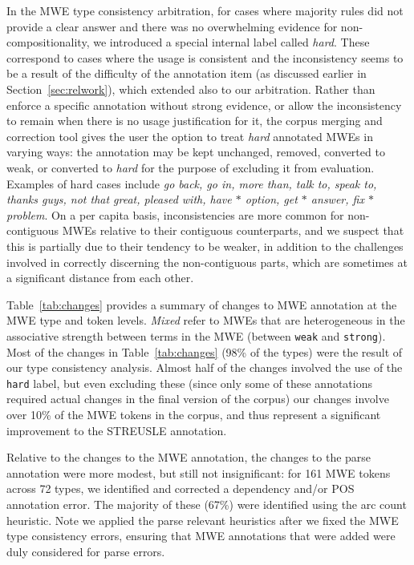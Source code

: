 \documentclass[output=paper
,modfonts
,nonflat]{langsci/langscibook}
\newcommand{\lex}[1]{\textit{#1}\xspace}
\newcommand{\mwetype}[1]{\texttt{#1}\xspace}
\newcommand{\strongish}{\mwetype{strong}}
\newcommand{\weak}{\mwetype{weak}}
\newcommand{\hard}{\mwetype{hard}}
\newcommand{\gap}{$*$\xspace}
\newcommand{\tableref}[1]{Table~\ref{#1}\xspace}
\newcommand{\sectionref}[1]{Section~\ref{#1}\xspace}
\begin{document}
In the MWE type consistency arbitration, for cases where majority rules did not provide a clear answer and there was no overwhelming evidence for non-compositionality, we introduced a special internal label called \lex{hard}. These correspond to cases where the usage is consistent and the inconsistency seems to be a result of the difficulty of the annotation item (as discussed earlier in \sectionref{sec:relwork}), which extended also to our arbitration. Rather than enforce a specific annotation without strong evidence, or allow the inconsistency to remain when there is no usage justification for it, the corpus merging and correction tool gives the user the option to treat \lex{hard} annotated MWEs in varying ways: the annotation may be kept unchanged, removed, converted to weak, or converted to \lex{hard} for the purpose of excluding it from evaluation. Examples of hard cases include \lex{go back, go in, more than, talk to, speak to, thanks guys, not that great, pleased with, have \gap option, get \gap answer, fix \gap problem}. On a per capita basis, inconsistencies are more common for non-contiguous MWEs relative to their contiguous counterparts, and we suspect that this is partially due to their tendency to be weaker, in addition to the challenges involved in correctly discerning the non-contiguous parts, which are sometimes at a significant distance from each other. 

\tableref{tab:changes} provides a summary of changes to MWE annotation at the MWE type and token levels.  \lex{Mixed} refer to MWEs that are heterogeneous in the associative strength between terms in the MWE (between \weak and \strongish). Most of the changes in \tableref{tab:changes} (98\% of the types) were the result of our type consistency analysis. Almost half of the changes involved the use of the \hard label, but even excluding these (since only some of these annotations required actual changes in the final version of the corpus) our changes involve over 10\% of the MWE tokens in the corpus, and thus represent a significant improvement to the STREUSLE annotation.  

Relative to the changes to the MWE annotation, the changes to the parse annotation were more modest, but still not insignificant: for 161 MWE tokens across 72 types, we identified and corrected a dependency and/or POS annotation error. The majority of these (67\%) were identified using the arc count heuristic. Note we applied the parse relevant heuristics after we fixed the MWE type consistency errors, ensuring that MWE annotations that were added were duly considered for parse errors.
\end{document}
